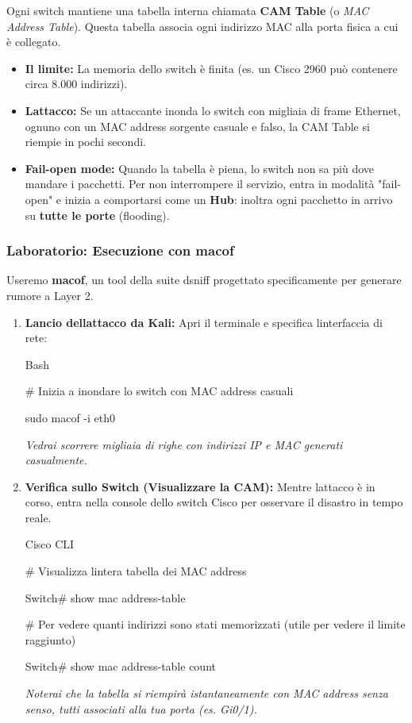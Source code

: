 \documentclass[11pt,a4paper]{article}
\begin{document}
Ogni switch mantiene una tabella interna chiamata \textbf{CAM Table} (o
\emph{MAC Address Table}). Questa tabella associa ogni indirizzo MAC
alla porta fisica a cui è collegato.

\begin{itemize}
\item
  \textbf{Il limite:} La memoria dello switch è finita (es. un Cisco
  2960 può contenere circa 8.000 indirizzi).
\item
  \textbf{L\textquotesingle attacco:} Se un attaccante inonda lo switch
  con migliaia di frame Ethernet, ognuno con un MAC address sorgente
  casuale e falso, la CAM Table si riempie in pochi secondi.
\item
  \textbf{Fail-open mode:} Quando la tabella è piena, lo switch non sa
  più dove mandare i pacchetti. Per non interrompere il servizio, entra
  in modalità "fail-open" e inizia a comportarsi come un \textbf{Hub}:
  inoltra ogni pacchetto in arrivo su \textbf{tutte le porte}
  (flooding).
\end{itemize}

\subsubsection{Laboratorio: Esecuzione con
macof}\label{laboratorio-esecuzione-con-macof}

Useremo \textbf{macof}, un tool della suite dsniff progettato
specificamente per generare rumore a Layer 2.

\begin{enumerate}
\def\labelenumi{\arabic{enumi}.}
\item
  \textbf{Lancio dell\textquotesingle attacco da Kali:} Apri il
  terminale e specifica l\textquotesingle interfaccia di rete:

  Bash

  \# Inizia a inondare lo switch con MAC address casuali

  sudo macof -i eth0

  \emph{Vedrai scorrere migliaia di righe con indirizzi IP e MAC
  generati casualmente.}
\item
  \textbf{Verifica sullo Switch (Visualizzare la CAM):} Mentre
  l\textquotesingle attacco è in corso, entra nella console dello switch
  Cisco per osservare il disastro in tempo reale.

  Cisco CLI

  \# Visualizza l\textquotesingle intera tabella dei MAC address

  Switch\# show mac address-table

  \# Per vedere quanti indirizzi sono stati memorizzati (utile per
  vedere il limite raggiunto)

  Switch\# show mac address-table count

  \emph{Noterai che la tabella si riempirà istantaneamente con MAC
  address senza senso, tutti associati alla tua porta (es. Gi0/1).}
\end{enumerate}
\end{document}
